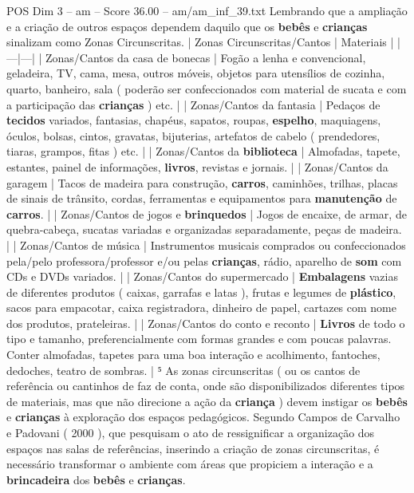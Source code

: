\begin{textsample}{POS Dim 3 – am – Score 36.00 – am/am\_inf\_39.txt}
Lembrando que a ampliação e a criação de outros espaços dependem daquilo que os \textbf{bebês} e \textbf{crianças} sinalizam como Zonas Circunscritas. | Zonas Circunscritas/Cantos | Materiais | |---|---| | Zonas/Cantos da casa de bonecas | Fogão a lenha e convencional, geladeira, TV, cama, mesa, outros móveis, objetos para utensílios de cozinha, quarto, banheiro, sala ( poderão ser confeccionados com material de sucata e com a participação das \textbf{crianças} ) etc. | | Zonas/Cantos da fantasia | Pedaços de \textbf{tecidos} variados, fantasias, chapéus, sapatos, roupas, \textbf{espelho}, maquiagens, óculos, bolsas, cintos, gravatas, bijuterias, artefatos de cabelo ( prendedores, tiaras, grampos, fitas ) etc. | | Zonas/Cantos da \textbf{biblioteca} | Almofadas, tapete, estantes, painel de informações, \textbf{livros}, revistas e jornais. | | Zonas/Cantos da garagem | Tacos de madeira para construção, \textbf{carros}, caminhões, trilhas, placas de sinais de trânsito, cordas, ferramentas e equipamentos para \textbf{manutenção} de \textbf{carros}. | | Zonas/Cantos de jogos e \textbf{brinquedos} | Jogos de encaixe, de armar, de quebra-cabeça, sucatas variadas e organizadas separadamente, peças de madeira. | | Zonas/Cantos de música | Instrumentos musicais comprados ou confeccionados pela/pelo professora/professor e/ou pelas \textbf{crianças}, rádio, aparelho de \textbf{som} com CDs e DVDs variados. | | Zonas/Cantos do supermercado | \textbf{Embalagens} vazias de diferentes produtos ( caixas, garrafas e latas ), frutas e legumes de \textbf{plástico}, sacos para empacotar, caixa registradora, dinheiro de papel, cartazes com nome dos produtos, prateleiras. | | Zonas/Cantos do conto e reconto | \textbf{Livros} de todo o tipo e tamanho, preferencialmente com formas grandes e com poucas palavras.
Conter almofadas, tapetes para uma boa interação e acolhimento, fantoches, dedoches, teatro de sombras. | ⁵ As zonas circunscritas ( ou os cantos de referência ou cantinhos de faz de conta, onde são disponibilizados diferentes tipos de materiais, mas que não direcione a ação da \textbf{criança} ) devem instigar os \textbf{bebês} e \textbf{crianças} à exploração dos espaços pedagógicos.
Segundo Campos de Carvalho e Padovani ( 2000 ), que pesquisam o ato de ressignificar a organização dos espaços nas salas de referências, inserindo a criação de zonas circunscritas, é necessário transformar o ambiente com áreas que propiciem a interação e a \textbf{brincadeira} dos \textbf{bebês} e \textbf{crianças}.

\end{textsample}
